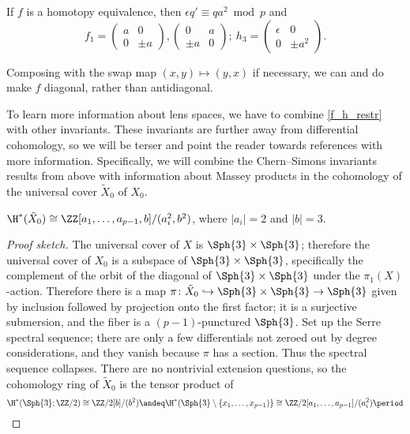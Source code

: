 \begin{prop}
\label{f_h_restr}
If $f$ is a homotopy equivalence, then $\epsilon q'\equiv qa^2 \bmod p$ and $$f_1=\begin{pmatrix}
   a &0 \\
    0& \pm a 
\end{pmatrix}, \begin{pmatrix}
  0 & a\\
     \pm a &0 
\end{pmatrix};\ h_3=\begin{pmatrix}
   \epsilon& 0\\
    0 & \pm a^2 
\end{pmatrix}.$$ 
\end{prop}
Composing with the swap map $(x, y)\mapsto (y, x)$ if necessary, we can and do make $f$ diagonal, rather than
antidiagonal.

To learn more information about lens spaces, we have to combine \cref{f_h_restr} with other invariants. These
invariants are further away from differential cohomology, so we will be terser and point the reader towards
references with more information. Specifically, we will combine the Chern--Simons invariants results from above
with information about Massey products in the cohomology of the universal cover
$\tilde X_0$ of $X_0$.
\begin{prop}
\label{deleted_square_coh}
$\H^*(\tilde X_0)\cong \ZZ[a_1,\dotsc,a_{p-1}, b]/(a_i^2, b^2)$, where $\lvert a_i\rvert = 2$ and $\lvert b
\rvert = 3$.
\end{prop}

\begin{proof}[Proof sketch]
  The universal cover of $X$ is $\Sph{3}\times \Sph{3}$; therefore the universal cover of $X_0$ is a subspace of $\Sph{3}\times
  \Sph{3}$, specifically the complement of the orbit of the diagonal of $\Sph{3}\times \Sph{3}$ under the $\pi_1(X)$-action.
  Therefore there is a map $\pi\colon \tilde X_0\hookrightarrow \Sph{3}\times \Sph{3}\to \Sph{3}$ given by inclusion followed by
  projection onto the first factor; it is a surjective submersion, and the fiber is a $(p-1)$-punctured $\Sph{3}$. 
  Set up the Serre spectral sequence; there are only a few differentials not
  zeroed out by degree considerations, and they vanish because $\pi$ has a section. 
  Thus the spectral sequence
  collapses. 
  There are no nontrivial extension questions, so the cohomology ring of $\tilde X_0$ is the tensor
  product of
  \begin{equation*}
    \H^*(\Sph{3};\ZZ/2)\cong\ZZ/2[b]/(b^2) \andeq \H^*(\Sph{3}\setminus \{x_1,\dotsc,x_{p-1})\}\cong\ZZ/2[a_1,\dotsc,a_{p-1}]/(a_i^2) \period \qedhere
  \end{equation*}
\end{proof}

